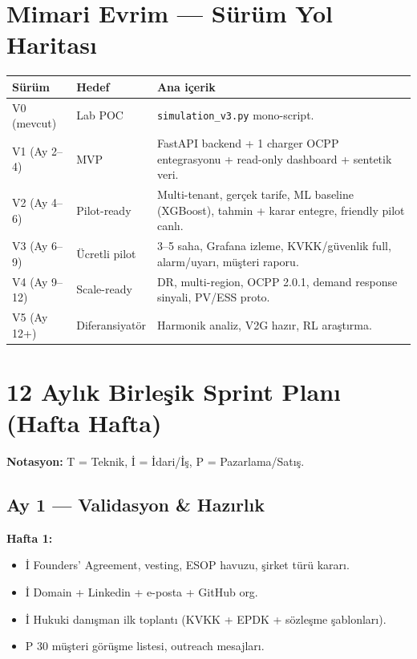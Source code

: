 \documentclass[11pt,a4paper]{article}
\begin{document}
\section{Mimari Evrim --- Sürüm Yol Haritası}

\begin{tabularx}{\textwidth}{l l X}
\toprule
\textbf{Sürüm} & \textbf{Hedef} & \textbf{Ana içerik} \\
\midrule
V0 (mevcut) & Lab POC & \texttt{simulation\_v3.py} mono-script. \\
V1 (Ay 2--4) & MVP & FastAPI backend + 1 charger OCPP entegrasyonu + read-only dashboard + sentetik veri. \\
V2 (Ay 4--6) & Pilot-ready & Multi-tenant, gerçek tarife, ML baseline (XGBoost), tahmin + karar entegre, friendly pilot canlı. \\
V3 (Ay 6--9) & Ücretli pilot & 3--5 saha, Grafana izleme, KVKK/güvenlik full, alarm/uyarı, müşteri raporu. \\
V4 (Ay 9--12) & Scale-ready & DR, multi-region, OCPP 2.0.1, demand response sinyali, PV/ESS proto. \\
V5 (Ay 12+) & Diferansiyatör & Harmonik analiz, V2G hazır, RL araştırma. \\
\bottomrule
\end{tabularx}

\section{12 Aylık Birleşik Sprint Planı (Hafta Hafta)}

\textbf{Notasyon:} {\color{blue!50!black}T} = Teknik, {\color{red!50!black}İ} = İdari/İş, {\color{green!50!black}P} = Pazarlama/Satış.

\subsection*{Ay 1 — Validasyon \& Hazırlık}

\textbf{Hafta 1:}
\begin{itemize}
    \item {\color{red!50!black}İ} Founders' Agreement, vesting, ESOP havuzu, şirket türü kararı.
    \item {\color{red!50!black}İ} Domain + Linkedin + e-posta + GitHub org.
    \item {\color{red!50!black}İ} Hukuki danışman ilk toplantı (KVKK + EPDK + sözleşme şablonları).
    \item {\color{green!50!black}P} 30 müşteri görüşme listesi, outreach mesajları.
\end{itemize}
\end{document}
